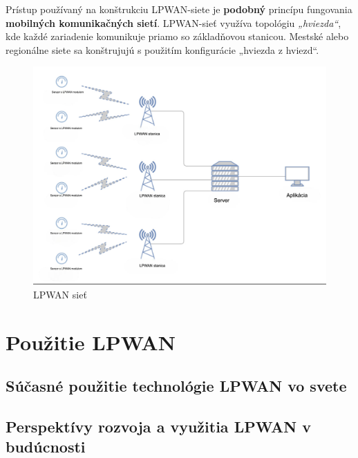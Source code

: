 \documentclass[11pt]{article}
\begin{document}
Prístup používaný na konštrukciu LPWAN-siete je \textbf{podobný} princípu fungovania \textbf{mobilných komunikačných sietí}. LPWAN-sieť využíva topológiu \textit{„hviezda“}, kde každé zariadenie komunikuje priamo so základňovou stanicou. Mestské alebo regionálne siete sa konštrujujú s použitím konfigurácie „hviezda z hviezd“.

\begin{figure}
    \centering
    \includegraphics[width=0.5\linewidth]{LPWAN_pc1.png}
    \caption{LPWAN sieť}
    \label{fig:pc1}
\end{figure}

\section*{\bf Použitie LPWAN }

\noindent
\subsection*{\bf Súčasné použitie technológie LPWAN vo svete}

\subsection*{\bf Perspektívy rozvoja a využitia LPWAN v budúcnosti}
\end{document}
